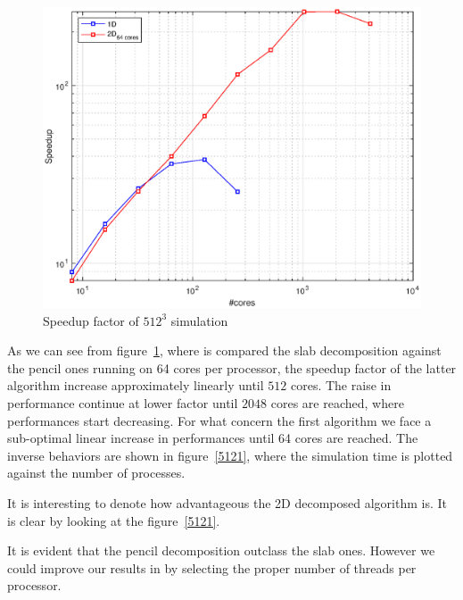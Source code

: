\begin{figure}
\begin{center}
\includegraphics[scale=0.6]{grafici/5122}
\caption{Speedup factor of $512^3$ simulation}
\label{5122}
\end{center}
\end{figure}

As we can see from figure~\ref{5122}, where is compared the slab decomposition against the pencil ones running on 64 cores per processor, the speedup factor of the latter algorithm increase approximately linearly until $512$ cores. The raise in performance continue at lower factor until $2048$ cores are reached, where performances start decreasing. For what concern the first algorithm we face a sub-optimal linear increase in performances until 64 cores are reached. 
The inverse behaviors are shown in figure~\ref{5121}, where the simulation time is plotted against the number of processes.
\par
It is interesting to denote how advantageous the 2D decomposed algorithm is. It is clear by looking at the figure~\ref{5121}.
\par
It is evident that the pencil decomposition outclass the slab ones. However we could improve our results in by selecting the proper number of threads per processor. \\
\par

